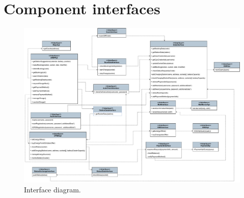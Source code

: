 \section{Component interfaces}
\begin{figure}[H]
    \centering
    \includegraphics[width=\textwidth]{images/InterfaceDiagram.pdf}
    \caption{Interface diagram.}
    \label{fig:interface}
\end{figure}
